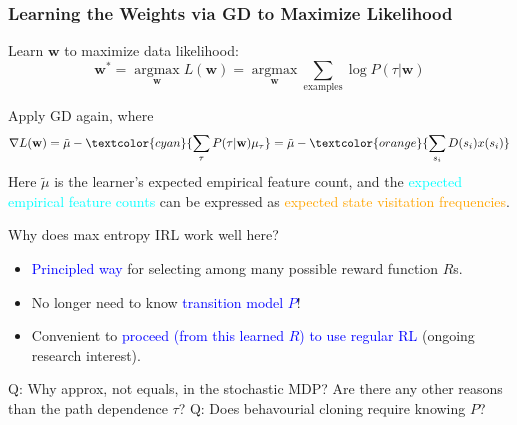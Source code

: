 \documentclass{article}
\begin{document}
\begin{thmbox}
    \subsubsection*{Learning the Weights via GD to Maximize Likelihood}
    Learn $\mathbf{w}$ to maximize data likelihood:
    \begin{equation*}
        \mathbf{w}^{*} 
        = \mathop{\arg \max}\limits_{\mathbf{w}} L(\mathbf{w})
        = \mathop{\arg \max}\limits_{\mathbf{w}} \sum_{\text{examples}} \log P(\tau | \mathbf{w})
    \end{equation*}

    Apply GD again, where
    \begin{equation*}
        \nabla L(\mathbf{w}) 
        = \tilde{\mu} - \textcolor{cyan}{\sum_{\tau} P(\tau | \mathbf{w}) \mu_{\tau}}
        = \tilde{\mu} - \textcolor{orange}{\sum_{s_i} D(s_i) x(s_i)}
    \end{equation*}
    Here $\tilde{\mu}$ is the learner's expected empirical feature count, and 
    the \textcolor{cyan}{expected empirical feature counts} can be expressed as \textcolor{orange}{expected state visitation frequencies}.
\end{thmbox}

Why does max entropy IRL work well here?
\begin{itemize}
\item \textcolor{blue}{Principled way} for selecting among many possible reward function $R$s. 
\item No longer need to know \textcolor{blue}{transition model $P$}!
\item Convenient to \textcolor{blue}{proceed (from this learned $R$) to use regular RL} (ongoing research interest).
\end{itemize}

\begin{hintbox}
    Q: Why approx, not equals, in the stochastic MDP? Are there any other reasons than the path dependence $\tau$?
    Q: Does behavourial cloning require knowing $P$?
\end{hintbox}
\end{document}
